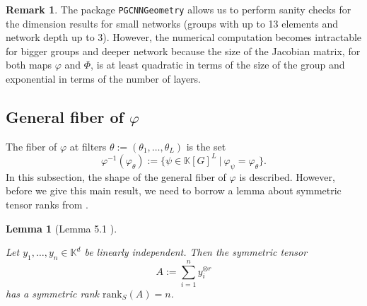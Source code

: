 \documentclass[final]{article}
\newcommand{\K}{\mathbb{K}}
\newcommand{\rank}{\text{rank}}
\theoremstyle{definition}
\newtheorem{remark}[definition]{Remark}
\theoremstyle{plain}
\newtheorem{lemma}[definition]{Lemma}
\begin{document}
\begin{remark}\label{rmk:dim_computation}
    The package \texttt{PGCNNGeometry} allows us to perform sanity checks for the dimension results for small networks (groups with up to 13 elements and network depth up to 3). 
    However, the numerical computation becomes intractable for bigger groups and deeper network because the size of the Jacobian matrix, for both maps $\varphi$ and $\Phi$, is at least quadratic in terms of the size of the group and exponential in terms of the number of layers.
\end{remark}


\subsection{General fiber of $\varphi$}
The fiber of $\varphi$ at filters $\theta:= (\theta_1, \dots, \theta_L)$ is the set
\[
\varphi^{-1}(\varphi_\theta) := \{\psi \in \K[G]^L\ |\ \varphi_\psi = \varphi_\theta\}.
\]
In this subsection, the shape of the general fiber of $\varphi$ is described. However, before we give this main result, we need to borrow a lemma about symmetric tensor ranks from \cite{comon2008symmetrictensorssymmetrictensor}.

\begin{lemma}[Lemma 5.1 \cite{comon2008symmetrictensorssymmetrictensor}]\label{lemma: symmetric_rank_of_linearly_indep_n_vector_is_n}

Let $y_1, \dots, y_n \in \K^{d}$ be linearly independent. Then the symmetric tensor 
\[
A:=\sum_{i=1}^n y_i^{\otimes r}
\]
has a symmetric rank $\rank_S(A) = n$.    
\end{lemma}
\end{document}
